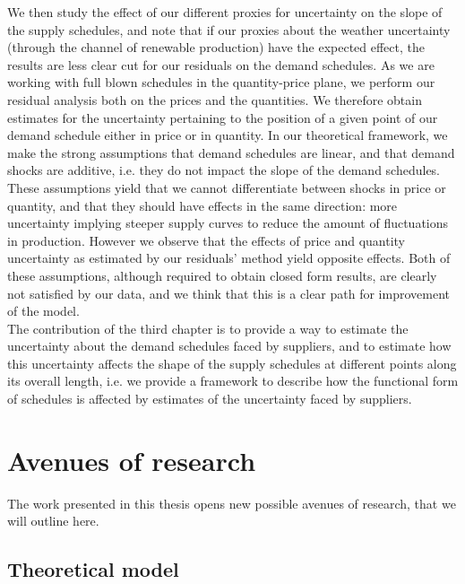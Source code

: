 We then study the effect of our different proxies for uncertainty on the slope of the supply schedules, and note that if our proxies about the weather uncertainty (through the channel of renewable production) have the expected effect, the results are less clear cut for our residuals on the demand schedules. As we are working with full blown schedules in the quantity-price plane, we perform our residual analysis both on the prices and the quantities. We therefore obtain estimates for the uncertainty pertaining to the position of a given point of our demand schedule either in price or in quantity. In our theoretical framework, we make the strong assumptions that demand schedules are linear, and that demand shocks are additive, i.e. they do not impact the slope of the demand schedules. These assumptions yield that we cannot differentiate between shocks in price or quantity, and that they should have effects in the same direction: more uncertainty implying steeper supply curves to reduce the amount of fluctuations in production. However we observe that the effects of price and quantity uncertainty as estimated by our residuals' method yield opposite effects. Both of these assumptions, although required to obtain closed form results, are clearly not satisfied by our data, and we think that this is a clear path for improvement of the model.  \\

The contribution of the third chapter is to provide a way to estimate the uncertainty about the demand schedules faced by suppliers, and to estimate how this uncertainty affects the shape of the supply schedules at different points along its overall length, i.e. we provide a framework to describe how the functional form of schedules is affected by estimates of the uncertainty faced by suppliers.\\

\section*{Avenues of research}

The work presented in this thesis opens new possible avenues of research, that we will outline here. 

\subsection*{Theoretical model}

